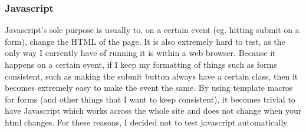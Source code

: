 \subsubsection{Javascript}
Javascript's sole purpose is usually to, on a certain event (eg. hitting submit on a form), change the HTML of the page. It is also extremely hard to test, as the only way I currently have of running it is within a web browser. Because it happens on a certain event, if I keep my formatting of things such as forms consistent, such as making the submit button always have a certain class, then it becomes extremely easy to make the event the same. By using template macros for forms (and other things that I want to keep consistent), it becomes trivial to have Javascript which works across the whole site and does not change when your html changes. For these reasons, I decided not to test javascript automatically.

